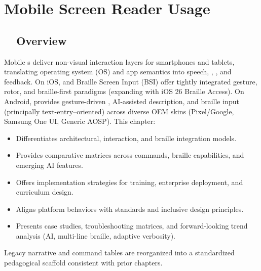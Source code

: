 \chapter{Mobile Screen Reader Usage}
\label{chap:mobile-screenreaders}

\section{~~Overview}
\label{sec:sr26-overview}
Mobile s deliver non-visual interaction layers for smartphones and tablets, translating operating system (OS) and app semantics into speech, , , and  feedback. On iOS,  and Braille Screen Input (BSI) offer tightly integrated gesture, rotor, and braille-first paradigms (expanding with iOS 26 Braille Access). On Android,  provides gesture-driven , AI-assisted description, and braille input (principally text-entry–oriented) across diverse OEM skins (Pixel/Google, Samsung One UI, Generic AOSP). This chapter:
\begin{itemize}
	\item Differentiates architectural, interaction, and braille integration models.
	\item Provides comparative matrices across commands, braille capabilities, and emerging AI features.
	\item Offers implementation strategies for training, enterprise deployment, and curriculum design.
	\item Aligns platform behaviors with  standards and inclusive design principles.
	\item Presents case studies, troubleshooting matrices, and forward-looking trend analysis (AI, multi-line braille, adaptive verbosity).
\end{itemize}
Legacy narrative and command tables are reorganized into a standardized pedagogical scaffold consistent with prior chapters.

